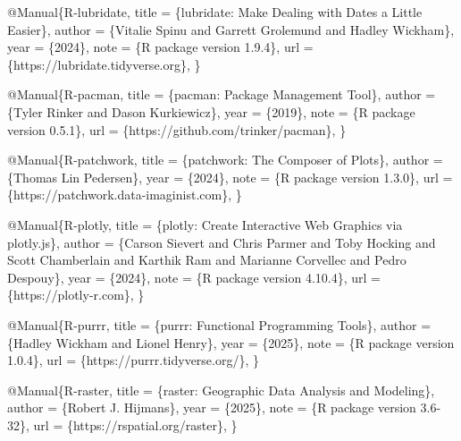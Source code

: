 \documentclass[
]{article}
\newenvironment{Shaded}{\begin{snugshade}}{\end{snugshade}}
\newcommand{\DataTypeTok}[1]{\textcolor[rgb]{0.13,0.29,0.53}{#1}}
\newcommand{\NormalTok}[1]{#1}
\newcommand{\OtherTok}[1]{\textcolor[rgb]{0.56,0.35,0.01}{#1}}
\newcommand{\VariableTok}[1]{\textcolor[rgb]{0.00,0.00,0.00}{#1}}
\begin{document}
\begin{Shaded}
\begin{Highlighting}[]
\VariableTok{@Manual}\NormalTok{\{}\OtherTok{R}\NormalTok{{-}}\OtherTok{lubridate}\NormalTok{,}
  \DataTypeTok{title}\NormalTok{ = \{lubridate: Make Dealing with Dates a Little Easier\},}
  \DataTypeTok{author}\NormalTok{ = \{Vitalie Spinu and Garrett Grolemund and Hadley Wickham\},}
  \DataTypeTok{year}\NormalTok{ = \{2024\},}
  \DataTypeTok{note}\NormalTok{ = \{R package version 1.9.4\},}
  \DataTypeTok{url}\NormalTok{ = \{https://lubridate.tidyverse.org\},}
\NormalTok{\}}

\VariableTok{@Manual}\NormalTok{\{}\OtherTok{R}\NormalTok{{-}}\OtherTok{pacman}\NormalTok{,}
  \DataTypeTok{title}\NormalTok{ = \{pacman: Package Management Tool\},}
  \DataTypeTok{author}\NormalTok{ = \{Tyler Rinker and Dason Kurkiewicz\},}
  \DataTypeTok{year}\NormalTok{ = \{2019\},}
  \DataTypeTok{note}\NormalTok{ = \{R package version 0.5.1\},}
  \DataTypeTok{url}\NormalTok{ = \{https://github.com/trinker/pacman\},}
\NormalTok{\}}

\VariableTok{@Manual}\NormalTok{\{}\OtherTok{R}\NormalTok{{-}}\OtherTok{patchwork}\NormalTok{,}
  \DataTypeTok{title}\NormalTok{ = \{patchwork: The Composer of Plots\},}
  \DataTypeTok{author}\NormalTok{ = \{Thomas Lin Pedersen\},}
  \DataTypeTok{year}\NormalTok{ = \{2024\},}
  \DataTypeTok{note}\NormalTok{ = \{R package version 1.3.0\},}
  \DataTypeTok{url}\NormalTok{ = \{https://patchwork.data{-}imaginist.com\},}
\NormalTok{\}}

\VariableTok{@Manual}\NormalTok{\{}\OtherTok{R}\NormalTok{{-}}\OtherTok{plotly}\NormalTok{,}
  \DataTypeTok{title}\NormalTok{ = \{plotly: Create Interactive Web Graphics via plotly.js\},}
  \DataTypeTok{author}\NormalTok{ = \{Carson Sievert and Chris Parmer and Toby Hocking and Scott Chamberlain and Karthik Ram and Marianne Corvellec and Pedro Despouy\},}
  \DataTypeTok{year}\NormalTok{ = \{2024\},}
  \DataTypeTok{note}\NormalTok{ = \{R package version 4.10.4\},}
  \DataTypeTok{url}\NormalTok{ = \{https://plotly{-}r.com\},}
\NormalTok{\}}

\VariableTok{@Manual}\NormalTok{\{}\OtherTok{R}\NormalTok{{-}}\OtherTok{purrr}\NormalTok{,}
  \DataTypeTok{title}\NormalTok{ = \{purrr: Functional Programming Tools\},}
  \DataTypeTok{author}\NormalTok{ = \{Hadley Wickham and Lionel Henry\},}
  \DataTypeTok{year}\NormalTok{ = \{2025\},}
  \DataTypeTok{note}\NormalTok{ = \{R package version 1.0.4\},}
  \DataTypeTok{url}\NormalTok{ = \{https://purrr.tidyverse.org/\},}
\NormalTok{\}}

\VariableTok{@Manual}\NormalTok{\{}\OtherTok{R}\NormalTok{{-}}\OtherTok{raster}\NormalTok{,}
  \DataTypeTok{title}\NormalTok{ = \{raster: Geographic Data Analysis and Modeling\},}
  \DataTypeTok{author}\NormalTok{ = \{Robert J. Hijmans\},}
  \DataTypeTok{year}\NormalTok{ = \{2025\},}
  \DataTypeTok{note}\NormalTok{ = \{R package version 3.6{-}32\},}
  \DataTypeTok{url}\NormalTok{ = \{https://rspatial.org/raster\},}
\NormalTok{\}}


\end{Highlighting}
\end{Shaded}
\end{document}
